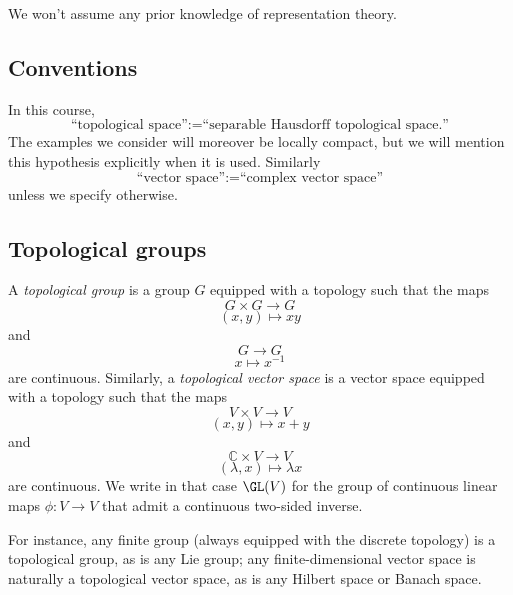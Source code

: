 \documentclass[reqno]{amsart} 
\begin{document}
We won't assume any prior knowledge of representation theory.

\subsection{Conventions}
In this course,
\begin{equation*}
   \text{``topological space''} := \text{``separable Hausdorff topological space.''}
\end{equation*}
The examples we consider will moreover be locally compact, but we will mention this hypothesis explicitly when it is used.  Similarly
\begin{equation*}
  \text{``vector space''} := \text{``complex vector space''}
\end{equation*}
unless we specify otherwise.

\subsection{Topological groups}
\begin{definition}
  A \emph{topological group} is a group $G$ equipped with a topology such that the maps
  \begin{equation*}
    G \times G \rightarrow G
  \end{equation*}
  \begin{equation*}
    (x,y) \mapsto x y
  \end{equation*}
  and
  \begin{equation*}
    G \rightarrow G
  \end{equation*}
  \begin{equation*}
    x \mapsto x^{-1}
  \end{equation*}
  are continuous.  Similarly, a \emph{topological vector space} is a vector space equipped with a topology such that the maps
  \begin{equation*}
    V \times V \rightarrow V
  \end{equation*}
  \begin{equation*}
    (x,y) \mapsto x + y
  \end{equation*}
  and
  \begin{equation*}
    \mathbb{C} \times V \rightarrow V
  \end{equation*}
  \begin{equation*}
    (\lambda,x) \mapsto \lambda x
  \end{equation*}
  are continuous.  We write in that case $\GL(V)$ for the group of continuous linear maps $\phi : V \rightarrow V$ that admit a continuous two-sided inverse.
\end{definition}
For instance, any finite group (always equipped with the discrete topology) is a topological group, as is any Lie group; any finite-dimensional vector space is naturally a topological vector space, as is any Hilbert space or Banach space.
\end{document}
